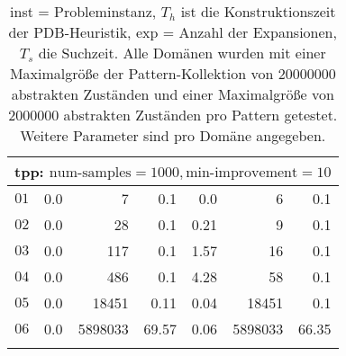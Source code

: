 \begin{longtable}{|c||r|r|r||r|r|r|}
\multicolumn{7}{|l|}{tpp: $\text{num-samples}=1000,\text{min-improvement}=10$}\\\hline
$01$ & 0.0 & 7 & 0.1 &0.0 & 6 & 0.1 \\\hline
$02$ & 0.0 & 28 & 0.1 &0.21 & 9 & 0.1 \\\hline
$03$ & 0.0 & 117 & 0.1 &1.57 & 16 & 0.1 \\\hline
$04$ & 0.0 & 486 & 0.1 &4.28 & 58 & 0.1 \\\hline
$05$ & 0.0 & 18451 & 0.11 &0.04 & 18451 & 0.1 \\\hline
$06$ & 0.0 & 5898033 & 69.57 &0.06 & 5898033 & 66.35 \\\hline

\caption{inst = Probleminstanz, $T_h$ ist die Konstruktionszeit der PDB-Heuristik, exp = Anzahl der Expansionen, $T_s$
die Suchzeit. Alle Domänen wurden mit einer Maximalgröße der Pattern-Kollektion von $20000000$ abstrakten Zuständen und
einer Maximalgröße von $2000000$ abstrakten Zuständen pro Pattern getestet. Weitere Parameter sind pro Domäne angegeben.}
\end{longtable}